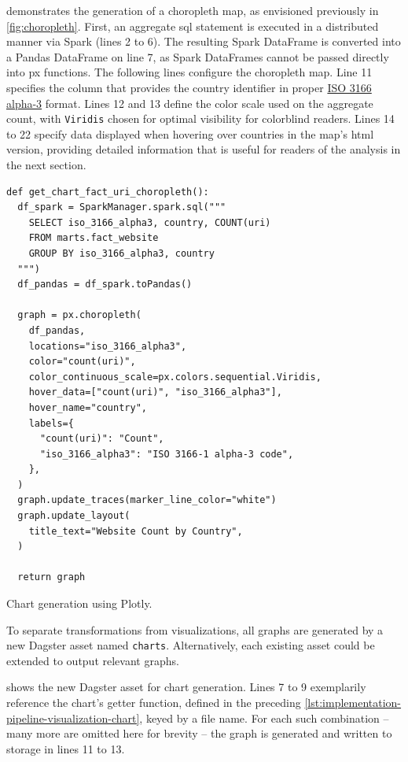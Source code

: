  demonstrates the generation of a choropleth map, as envisioned previously in \cref{fig:choropleth}.
First, an aggregate \ac{sql} statement is executed in a distributed manner via Spark (lines 2 to 6).
The resulting Spark DataFrame is converted into a Pandas DataFrame on line 7, as Spark DataFrames cannot be passed directly into \ac{px} functions.
The following lines configure the choropleth map.
Line 11 specifies the column that provides the country identifier in proper \href{https://www.iso.org/iso-3166-country-codes.html}{ISO 3166 alpha-3} format.
Lines 12 and 13 define the color scale used on the aggregate count, with \texttt{Viridis} chosen for optimal visibility for colorblind readers.
Lines 14 to 22 specify data displayed when hovering over countries in the map's \ac{html} version, providing detailed information that is useful for readers of the analysis in the next section.

\begin{listing}[H]
\begin{verbatim}
def get_chart_fact_uri_choropleth():
  df_spark = SparkManager.spark.sql("""
    SELECT iso_3166_alpha3, country, COUNT(uri)
    FROM marts.fact_website
    GROUP BY iso_3166_alpha3, country
  """)
  df_pandas = df_spark.toPandas()

  graph = px.choropleth(
    df_pandas,
    locations="iso_3166_alpha3",
    color="count(uri)",
    color_continuous_scale=px.colors.sequential.Viridis,
    hover_data=["count(uri)", "iso_3166_alpha3"],
    hover_name="country",
    labels={
      "count(uri)": "Count",
      "iso_3166_alpha3": "ISO 3166-1 alpha-3 code",
    },
  )
  graph.update_traces(marker_line_color="white")
  graph.update_layout(
    title_text="Website Count by Country",
  )

  return graph
\end{verbatim}
\caption{Chart generation using Plotly.}
\label{lst:implementation-pipeline-visualization-chart}
\end{listing}

To separate transformations from visualizations, all graphs are generated by a new Dagster asset named \texttt{charts}.
Alternatively, each existing asset could be extended to output relevant graphs.

 shows the new Dagster asset for chart generation.
Lines 7 to 9 exemplarily reference the chart's getter function, defined in the preceding \cref{lst:implementation-pipeline-visualization-chart}, keyed by a file name.
For each such combination -- many more are omitted here for brevity -- the graph is generated and written to storage in lines 11 to 13.

